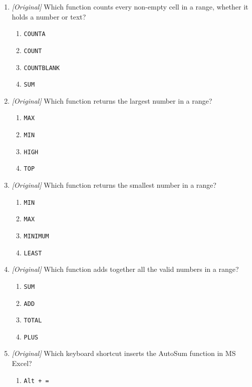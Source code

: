 \begin{enumerate}[label=\textbf{Q\arabic*.}, leftmargin=*]
\begin{enumerate}[label=\Alph*.]
    \item 6
    \item 8
    \item 10
    \item 4
  \end{enumerate}
\item \textit{[Original]} Which function counts every non-empty cell in a
  range, whether it holds a number or text?
  \begin{enumerate}[label=\Alph*.]
    \item \texttt{COUNTA}
    \item \texttt{COUNT}
    \item \texttt{COUNTBLANK}
    \item \texttt{SUM}
  \end{enumerate}
\item \textit{[Original]} Which function returns the largest number in a
  range?
  \begin{enumerate}[label=\Alph*.]
    \item \texttt{MAX}
    \item \texttt{MIN}
    \item \texttt{HIGH}
    \item \texttt{TOP}
  \end{enumerate}
\item \textit{[Original]} Which function returns the smallest number in a
  range?
  \begin{enumerate}[label=\Alph*.]
    \item \texttt{MIN}
    \item \texttt{MAX}
    \item \texttt{MINIMUM}
    \item \texttt{LEAST}
  \end{enumerate}
\item \textit{[Original]} Which function adds together all the valid numbers
  in a range?
  \begin{enumerate}[label=\Alph*.]
    \item \texttt{SUM}
    \item \texttt{ADD}
    \item \texttt{TOTAL}
    \item \texttt{PLUS}
  \end{enumerate}
\item \textit{[Original]} Which keyboard shortcut inserts the AutoSum function
  in MS Excel?
  \begin{enumerate}[label=\Alph*.]
    \item \texttt{Alt + =}

\end{enumerate}
\end{enumerate}
